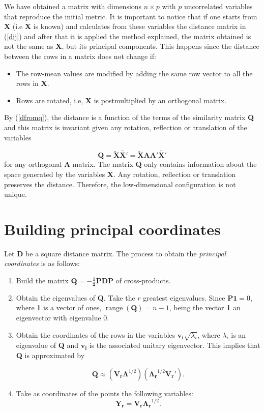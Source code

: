 \documentclass[11pt]{report}
\DeclareMathOperator{\range}{range}
\begin{document}
We have obtained a matrix with dimensions $n \times p$ with $p$ uncorrelated
variables that reproduce the initial metric. It is important to notice that if 
one starts from \textbf{X} (i.e \textbf{X} is known) and calculates from these
variables the distance matrix in (\ref{dij}) and after that it is applied
the method explained, the matrix obtained is not the same as \textbf{X}, but
its principal components. This happens since the distance between the rows in
a matrix does not change if:

\begin{itemize}
\item The row-mean values are modified by adding the same row vector to all
the rows in \textbf{X}.

\item Rows are rotated, i.e, \textbf{X} is postmultiplied by an orthogonal 
matrix.
\end{itemize}

\indent By (\ref{dfromq}), the distance is a function of the terms of the 
similarity matrix \textbf{Q} and this matrix is invariant given any rotation,
reflection or translation of the variables

\[
\mathbf{Q} = \mathbf{\widetilde{X}} \mathbf{\widetilde{X'}} = \mathbf{\widetilde{X}} \mathbf{A} \mathbf{A'}\mathbf{\widetilde{X'}}
\]
for any orthogonal \textbf{A} matrix. The matrix \textbf{Q} only contains 
information about the space generated by the variables \textbf{X}. Any rotation,
reflection or translation preserves the distance. Therefore, the low-dimensional
configuration is not unique.


\section{Building principal coordinates}
Let \textbf{D} be a square distance matrix. The process to obtain 
the \textit{principal coordinates} is as follows:

\begin{enumerate}
\item Build the matrix $\mathbf{Q = - \frac{1}{2} PDP}$ of cross-products.
\item Obtain the eigenvalues of \textbf{Q}. Take the $r$ greatest eigenvalues. 
Since $\mathbf{P1}=0$, where \textbf{1} is a vector of ones, 
$\range(\mathbf{Q})=n-1$, being the vector \textbf{1} an eigenvector with 
eigenvalue 0. 
\item Obtain the coordinates of the rows in the variables 
$\mathbf{v_i}\sqrt{\lambda_i}$,
where $\lambda_i$ is an eigenvalue of \textbf{Q} and $\mathbf{v_i}$ is the
associated unitary eigenvector. This implies that \textbf{Q} is approximated by

\[
\mathbf{Q} \approx (\mathbf{V_r \Lambda}^{1/2})(\mathbf{\Lambda_r}^{1/2} \mathbf{V_r'}).
\]

\item Take as coordinates of the points the following variables:
\[
\mathbf{Y_r} = \mathbf{V_r}\mathbf{\Lambda_r}^{1/2}.
\]
\end{enumerate}
\end{document}

